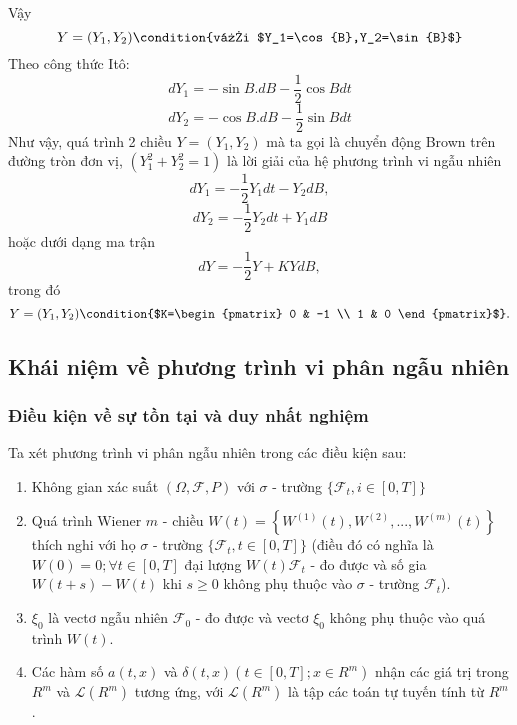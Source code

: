 \documentclass[14pt,a4paper]{article}
\numberwithin{equation}{section}
\begin{document}
Vậy
\begin{equation*}
	Y=(Y_1,Y_2) \condition{với $Y_1=\cos{B},Y_2=\sin{B}$}
\end{equation*}
Theo công thức Itô:
\begin{equation*}
	dY_1=-\sin{B.dB}-\dfrac{1}{2}\cos{B}dt
\end{equation*}
\begin{equation*}
	dY_2=-\cos{B.dB}-\dfrac{1}{2}\sin{B}dt
\end{equation*}
Như vậy, quá trình 2 chiều $Y=(Y_1,Y_2)$ mà ta gọi là chuyển động Brown trên đường tròn đơn vị, $(Y_1^2+Y_2^2=1)$ là lời giải của hệ phương trình vi ngẫu nhiên
\begin{equation*}
	dY_1=-\dfrac{1}{2}Y_1dt-Y_2dB,
\end{equation*}
\begin{equation*}
	dY_2=-\dfrac{1}{2}Y_2dt+Y_1dB
\end{equation*}
hoặc dưới dạng ma trận
\begin{equation*}
	dY=-\dfrac{1}{2}Y+KYdB,
\end{equation*} 
trong đó
\begin{equation*}
	Y=(Y_1,Y_2)\condition{$K=\begin{pmatrix} 0 & -1 \\ 1 & 0 \end{pmatrix}$}.
\end{equation*}

\subsection{Khái niệm về phương trình vi phân ngẫu nhiên}
\subsubsection{Điều kiện về sự tồn tại và duy nhất nghiệm}
Ta xét phương trình vi phân ngẫu nhiên trong các điều kiện sau:
\begin{enumerate}[(1)]
	\item Không gian xác suất $(\Omega,\mathscr{F},P)$ với $\sigma$ - trường $\{\mathscr{F}_t,i\in [0,T]\}$
	\item Quá trình Wiener $m$ - chiều $W(t)=\left\{W^{(1)}(t),W^{(2)},...,W^{(m)}(t) \right\}$ thích nghi với họ $\sigma$ - trường $\{\mathscr{F}_t,t\in [0,T] \}$ (điều đó có nghĩa là $W(0)=0;\forall t\in[0,T]$ đại lượng $W(t)\mathscr{F}_t$ - đo được và số gia $W(t+s)-W(t)$ khi $s\geq0$ không phụ thuộc vào $\sigma$ - trường $\mathscr{F}_t$).
	\item $\xi_0$ là vectơ ngẫu nhiên $\mathscr{F}_0$ - đo được và vectơ $\xi_0$ không phụ thuộc vào quá trình $W(t)$.
	\item Các hàm số $a(t,x)$ và $\delta(t,x)\left(t\in [0,T];x\in R^m \right)$ nhận các giá trị trong $R^m$ và $\mathscr{L}(R^m)$ tương ứng, với $\mathscr{L}(R^m)$ là tập các toán tự tuyến tính từ $R^m$.\\
\end{enumerate}
\end{document}
